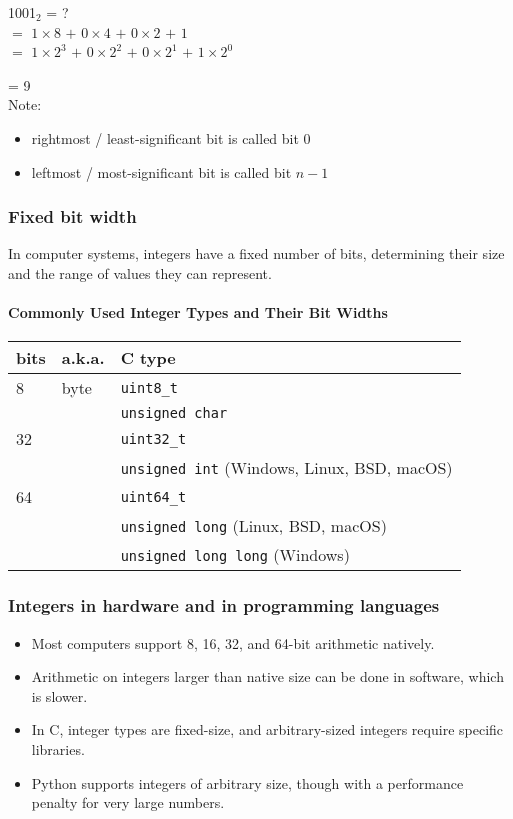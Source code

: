 \documentclass[12pt]{article}
\begin{document}
1001$_2$ = ?\\
$=$ $1 \times 8$ $+$ 
$0 \times 4$ $+$ 
$0 \times 2$ $+$ 
 $1$ \\
$=$ $1 \times 2^3$  $+$ 
$0 \times 2^2$ $+$ 
$0 \times 2^1$ $+$ 
 $1 \times 2^0$ 

= 9\\

Note:
\begin{itemize}
\item rightmost / least-significant bit is called bit 0
\item leftmost / most-significant bit is called bit $n - 1$
\end{itemize}


\subsubsection{Fixed bit width}
In computer systems, integers have a fixed number of bits, determining their size and the range of values they can represent.

\paragraph{Commonly Used Integer Types and Their Bit Widths}
\begin{tabular}{lll}
\textbf{bits} & \textbf{a.k.a.} & \textbf{C type} \\
\hline
8  & byte & \texttt{uint8\_t} \\
   &      & \texttt{unsigned char} \\
32 &      & \texttt{uint32\_t} \\
   &      & \texttt{unsigned int} (Windows, Linux, BSD, macOS) \\
64 &      & \texttt{uint64\_t} \\
   &      & \texttt{unsigned long} (Linux, BSD, macOS) \\
   &      & \texttt{unsigned long long} (Windows) \\
\end{tabular}


\subsubsection{Integers in hardware and in programming languages}
\begin{itemize}
    \item Most computers support 8, 16, 32, and 64-bit arithmetic natively.
    \item Arithmetic on integers larger than native size can be done in software, which is slower.
    \item In C, integer types are fixed-size, and arbitrary-sized integers require specific libraries.
    \item Python supports integers of arbitrary size, though with a performance penalty for very large numbers.
\end{itemize}
\end{document}
